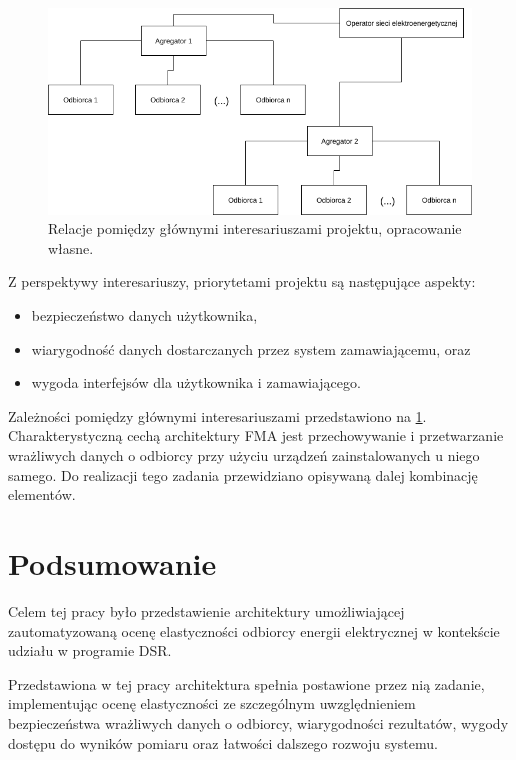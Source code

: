 \begin{figure}
\hypertarget{fig:stakeholders}{%
\centering
\includegraphics{img/aktorzy.png}
\caption{Relacje pomiędzy głównymi interesariuszami projektu,
opracowanie własne.}\label{fig:stakeholders}
}
\end{figure}

Z perspektywy interesariuszy, priorytetami projektu są następujące
aspekty:

\begin{itemize}
\tightlist
\item
  bezpieczeństwo danych użytkownika,
\item
  wiarygodność danych dostarczanych przez system zamawiającemu, oraz
\item
  wygoda interfejsów dla użytkownika i zamawiającego.
\end{itemize}

Zależności pomiędzy głównymi interesariuszami przedstawiono na
\cref{fig:stakeholders}. Charakterystyczną cechą architektury FMA jest
przechowywanie i przetwarzanie wrażliwych danych o odbiorcy przy użyciu
urządzeń zainstalowanych u niego samego. Do realizacji tego zadania
przewidziano opisywaną dalej kombinację elementów.

\hypertarget{podsumowanie}{%
\chapter{Podsumowanie}\label{podsumowanie}}

Celem tej pracy było przedstawienie architektury umożliwiającej
zautomatyzowaną ocenę elastyczności odbiorcy energii elektrycznej w
kontekście udziału w programie DSR.

Przedstawiona w tej pracy architektura spełnia postawione przez nią
zadanie, implementując ocenę elastyczności ze szczególnym uwzględnieniem
bezpieczeństwa wrażliwych danych o odbiorcy, wiarygodności rezultatów,
wygody dostępu do wyników pomiaru oraz łatwości dalszego rozwoju
systemu.

